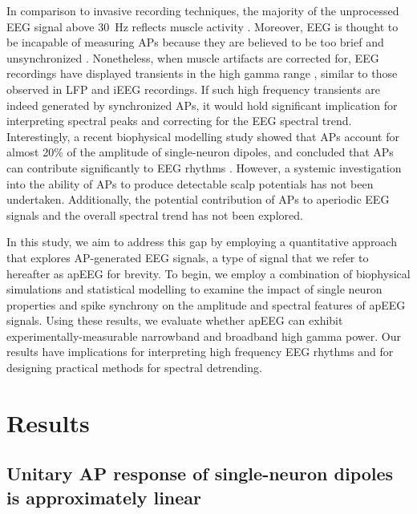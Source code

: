 In comparison to invasive recording techniques, the majority of the unprocessed EEG signal above 30~\unit{\hertz} reflects muscle activity \cite{Whitham2007, Whitham2008, Fitzgibbon2013, Muthukumaraswamy2013}. Moreover, EEG is thought to be incapable of measuring APs because they are believed to be too brief and unsynchronized \cite{Nunez2006, Buzsaki2012}. Nonetheless, when muscle artifacts are corrected for, EEG recordings have displayed transients in the high gamma range \cite{Onton2009, Volker2018, Seeber2015}, similar to those observed in LFP and iEEG recordings. If such high frequency transients are indeed generated by synchronized APs, it would hold significant implication for interpreting spectral peaks and correcting for the EEG spectral trend. Interestingly, a recent biophysical modelling study showed that APs account for almost 20\% of the amplitude of single-neuron dipoles, and concluded that APs can contribute significantly to EEG rhythms \cite{Thio2023}. However, a systemic investigation into the ability of APs to produce detectable scalp potentials has not been undertaken. Additionally, the potential contribution of APs to aperiodic EEG signals and the overall spectral trend has not been explored.

In this study, we aim to address this gap by employing a quantitative approach that explores AP-generated EEG signals, a type of signal that we refer to hereafter as apEEG for brevity. To begin, we employ a combination of biophysical simulations and statistical modelling to examine the impact of single neuron properties and spike synchrony on the amplitude and spectral features of apEEG signals. Using these results, we evaluate whether apEEG can exhibit experimentally-measurable narrowband and broadband high gamma power. Our results have implications for interpreting high frequency EEG rhythms and for designing practical methods for spectral detrending.

\section{Results}

\subsection{Unitary AP response of single-neuron dipoles is approximately linear}

